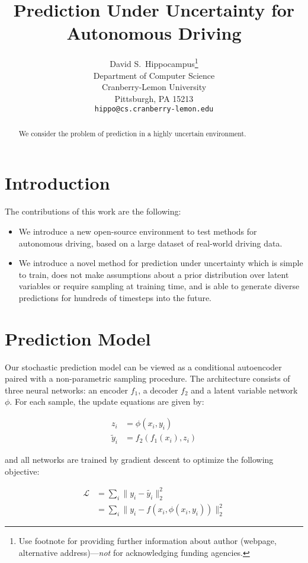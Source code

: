 \documentclass{article}
\title{Prediction Under Uncertainty for Autonomous Driving}
\author{
  David S.~Hippocampus\thanks{Use footnote for providing further
    information about author (webpage, alternative
    address)---\emph{not} for acknowledging funding agencies.} \\
  Department of Computer Science\\
  Cranberry-Lemon University\\
  Pittsburgh, PA 15213 \\
  \texttt{hippo@cs.cranberry-lemon.edu} \\
}
\begin{document}

\maketitle

\begin{abstract}
  We consider the problem of prediction in a highly uncertain environment.
\end{abstract}


\section{Introduction}

The contributions of this work are the following:
\begin{itemize}
\item We introduce a new open-source environment to test methods for autonomous driving, based on a large dataset of real-world driving data.
\item We introduce a novel method for prediction under uncertainty which is simple to train, does not make assumptions about a prior distribution over latent variables or require sampling at training time, and is able to generate diverse predictions for hundreds of timesteps into the future.
\end{itemize}


\section{Prediction Model}

Our stochastic prediction model can be viewed as a conditional autoencoder paired with a non-parametric sampling procedure.
The architecture consists of three neural networks: an encoder $f_1$, a decoder $f_2$ and a latent variable network $\phi$.
For each sample, the update equations are given by:

\begin{align*}
z_i &= \phi(x_i, y_i) \\
\tilde{y}_i &= f_2(f_1(x_i), z_i)
\end{align*}

and all networks are trained by gradient descent to optimize the following objective:

\begin{align}
  \mathcal{L} &= \sum_i \|y_i - \tilde{y_i} \|_2^2 \\
  &= \sum_i \|y_i - f(x_i, \phi(x_i, y_i)) \|_2^2
\end{align}
\end{document}
